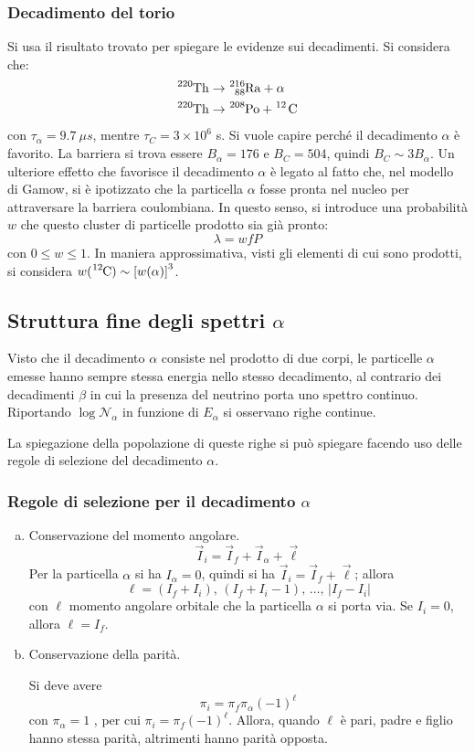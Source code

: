 \documentclass[11pt, a4paper]{scrartcl}
\theoremstyle{style}
\numberwithin{equation}{subsection}
\begin{document}
\subsubsection{Decadimento del torio}

Si usa il risultato trovato per spiegare le evidenze sui decadimenti.
Si considera che:
\[
\begin{split}
	& \ce{^{220}Th} \to  \ce{^{216}_{88}Ra + \alpha }\\
	& \ce{^{220}Th} \to \ce{^{208}Po + ^{12} C}
\end{split} 
\] 
con $\tau _\alpha  = 9.7 ~\mu s$, mentre $\tau _C = 3 \times 10^{6}$ s.
Si vuole capire perch\'e il decadimento $\alpha $ \`e favorito.
La barriera si trova essere $B_\alpha = 176$ e $B_C = 504$, quindi $B_C \sim 3 B_\alpha $.
Un ulteriore effetto che favorisce il decadimento $\alpha $ \`e legato al fatto che, nel modello di Gamow, si \`e ipotizzato che la particella $\alpha $ fosse pronta nel nucleo per attraversare la barriera coulombiana.
In questo senso, si introduce una probabilit\`a $w$ che questo cluster di particelle prodotto sia gi\`a pronto:
\[
\lambda  = w f P
\] 
con $0\le w \le  1$. 
In maniera approssimativa, visti gli elementi di cui sono prodotti, si considera $w(\ce{^{12}C}) \sim \left[ w(\alpha ) \right] ^3$.


\subsection{Struttura fine degli spettri $\alpha $}

Visto che il decadimento $\alpha $ consiste nel prodotto di due corpi, le particelle $\alpha $ emesse hanno sempre stessa energia nello stesso decadimento, al contrario dei decadimenti $\beta $ in cui la presenza del neutrino porta uno spettro continuo.
Riportando $\log \mathcal{N} _\alpha $ in funzione di $E_\alpha $ si osservano righe continue. 

La spiegazione della popolazione di queste righe si pu\`o spiegare facendo uso delle regole di selezione del decadimento $\alpha $.
\subsubsection{Regole di selezione per il decadimento $\alpha $}
\begin{enumerate}[(a).]
	\item Conservazione del momento angolare.
	\[
	\vec{I}_i = \vec{I}_f + \vec{I}_\alpha  + \vec{\ell }
	\] 
	Per la particella $\alpha $ si ha $I_\alpha = 0 $, quindi si ha $\vec{I}_i = \vec{I}_f + \vec{\ell }$; allora
	\[
	\ell  = (I_f + I_i) , \, (I_f + I_i - 1) ,\, \ldots , \, \lvert I_f - I_i \rvert 
	\] 
con $\ell $ momento angolare orbitale che la particella $\alpha $ si porta via. 
Se $I_i = 0$, allora $\ell = I_f$.
\item Conservazione della parit\`a.

	Si deve avere
	\[
	\pi_i = \pi_f \pi_\alpha  \left(-1\right) ^{\ell }
	\] 
con $\pi _ \alpha  = 1$	, per cui $\pi_i = \pi_f \left(-1\right) ^{\ell }$.
Allora, quando $\ell $ \`e pari, padre e figlio hanno stessa parit\`a, altrimenti hanno parit\`a opposta.
\end{enumerate}
\end{document}

